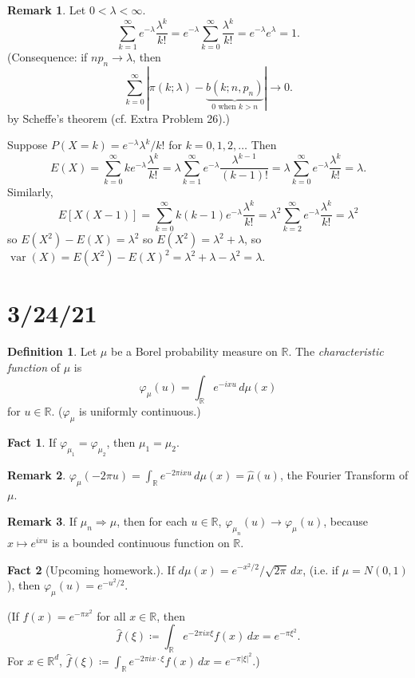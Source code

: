 \documentclass{article}
\newcommand{\R}{\mathbb{R}}
\DeclareMathOperator{\var}{var}
\theoremstyle{definition}
\newtheorem*{definition}{Definition}
\newtheorem*{remark}{Remark}
\newtheorem*{fact}{Fact}
\begin{document}
\begin{remark}
Let $0 < \lambda < \infty$.
\[
    \sum_{k=1}^\infty e^{-\lambda} \frac{\lambda^k}{k!} = e^{-\lambda} \sum_{k=0}^\infty \frac{\lambda^k}{k!} = e^{-\lambda}e^\lambda = 1.
\]
(Consequence: if $np_n \to \lambda$, then
\[
    \sum_{k=0}^\infty |\pi(k; \lambda) - \underbrace{b(k; n, p_n)}_{0 \text{ when } k > n}| \to 0.
\]
by Scheffe's theorem (cf. Extra Problem 26).)
\end{remark}

Suppose $P(X = k) = e^{-\lambda} \lambda^k/k!$ for $k = 0, 1, 2, \dots$ Then
\[
    E(X) = \sum_{k=0}^\infty ke^{-\lambda}\frac{\lambda^k}{k!} = \lambda\sum_{k=1}^\infty e^{-\lambda} \frac{\lambda^{k-1}}{(k-1)!} = \lambda\sum_{k=0}^\infty e^{-\lambda}\frac{\lambda^k}{k!} = \lambda.
\]
Similarly,
\[
    E[X(X-1)] = \sum_{k=0}^\infty k(k-1)e^{-\lambda}\frac{\lambda^k}{k!} = \lambda^2\sum_{k=2}^\infty e^{-\lambda}\frac{\lambda^k}{k!} = \lambda^2
\]
so $E(X^2) - E(X) = \lambda^2$ so $E(X^2) = \lambda^2 + \lambda$, so $\var(X) = E(X^2) - E(X)^2 = \lambda^2 + \lambda - \lambda^2 = \lambda$.

\section*{3/24/21}

\begin{definition}
    Let $\mu$ be a Borel probability measure on $\R$. The \emph{characteristic function} of $\mu$ is
    \[
        \varphi_\mu(u) = \int_\R e^{-ixu} \,d\mu(x)
    \]
    for $u \in \R$.
    ($\varphi_\mu$ is uniformly continuous.)
\end{definition}

\begin{fact}
If $\varphi_{\mu_1} = \varphi_{\mu_2}$, then $\mu_1 = \mu_2$.
\end{fact}
\begin{remark}
$\varphi_\mu(-2\pi u) = \int_\R e^{-2\pi ixu} \,d\mu(x) = \widehat{\mu}(u)$, the Fourier Transform of $\mu$.
\end{remark}
\begin{remark}
If $\mu_n \Rightarrow \mu$, then for each $u \in \R$, $\varphi_{\mu_n}(u) \to \varphi_\mu(u)$, because $x \mapsto e^{ixu}$ is a bounded continuous function on $\R$.
\end{remark}
\begin{fact}[Upcoming homework.]
If $d\mu(x) = e^{-x^2/2}/\sqrt{2\pi} \,dx$, (i.e. if $\mu = N(0,1)$), then $\varphi_\mu(u) = e^{-u^2/2}$.

(If $f(x) = e^{-\pi x^2}$ for all $x \in \R$, then
\[
    \widehat{f}(\xi) \coloneqq \int_\R e^{-2\pi i x\xi} f(x) \,dx = e^{-\pi\xi^2}.
\]
For $x \in \R^d$, $\widehat{f}(\xi) \coloneqq \int_\R e^{-2\pi i x \cdot \xi} f(x) \,dx = e^{-\pi|\xi|^2}$.)
\end{fact}
\end{document}
